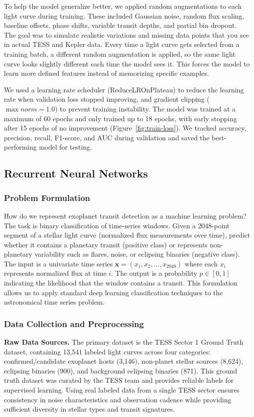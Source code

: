 \documentclass[letterpaper]{article} %
\begin{document}
To help the model generalize better, we applied random augmentations to each light curve during training. These included Gaussian noise, random flux scaling, baseline offsets, phase shifts, variable transit depths, and partial bin dropout. The goal was to simulate realistic variations and missing data points that you see in actual TESS and Kepler data. Every time a light curve gets selected from a training batch, a different random augmentation is applied, so the same light curve looks slightly different each time the model sees it. This forces the model to learn more defined features instead of memorizing specific examples.

We used a learning rate scheduler (ReduceLROnPlateau) to reduce the learning rate when validation loss stopped improving, and gradient clipping ($\max norm=1.0$) to prevent training instability. The model was trained at a maximum of 60 epochs and only trained up to 18 epochs, with early stopping after 15 epochs of no improvement (Figure~\ref{fig:train-loss}). We tracked accuracy, precision, recall, F1-score, and AUC during validation and saved the best-performing model for testing.

\subsection{Recurrent Neural Networks}
\subsubsection{Problem Formulation}
How do we represent exoplanet transit detection as a machine learning problem? The task is binary classification of time-series windows. Given a 2048-point segment of a stellar light curve (normalized flux measurements over time), predict whether it contains a planetary transit (positive class) or represents non-planetary variability such as flares, noise, or eclipsing binaries (negative class). The input is a univariate time series $\mathbf{x} = (x_1, x_2, \ldots, x_{2048})$ where each $x_i$ represents normalized flux at time $i$. The output is a probability $p \in [0,1]$ indicating the likelihood that the window contains a transit. This formulation allows us to apply standard deep learning classification techniques to the astronomical time series problem.

\subsubsection{Data Collection and Preprocessing}
\textbf{Raw Data Sources.} The primary dataset is the TESS Sector 1 Ground Truth dataset, containing 13,541 labeled light curves across four categories: confirmed/candidate exoplanet hosts (3,146), non-planet stellar sources (8,624), eclipsing binaries (900), and background eclipsing binaries (871). This ground truth dataset was curated by the TESS team and provides reliable labels for supervised learning. Using real labeled data from a single TESS sector ensures consistency in noise characteristics and observation cadence while providing sufficient diversity in stellar types and transit signatures.
\end{document}
